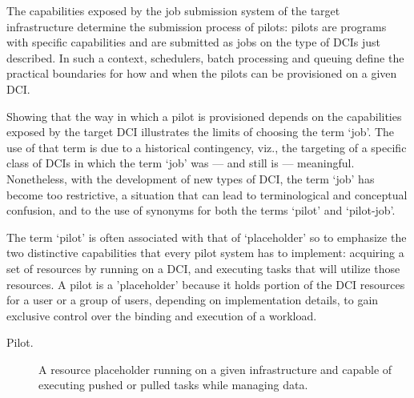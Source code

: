 \documentclass{sig-alternate}
\begin{document}
The capabilities exposed by the job submission system of the target
infrastructure determine the submission process of pilots: pilots are programs
with specific capabilities and are submitted as jobs on the type of DCIs just
described. In such a context, schedulers, batch processing and queuing define
the practical boundaries for how and when the pilots can be provisioned on a
given DCI.

Showing that the way in which a pilot is provisioned depends on the
capabilities exposed by the target DCI illustrates the limits of choosing the
term `job'. The use of that term is due to a historical contingency, viz., the
targeting of a specific class of DCIs in which the term `job' was --- and still
is --- meaningful. Nonetheless, with the development of new types of DCI, the
term `job' has become too restrictive, a situation that can lead to
terminological and conceptual confusion, and to the use of synonyms for both
the terms `pilot' and `pilot-job'.

The term `pilot' is often associated with that of `placeholder' so to
emphasize the two distinctive capabilities that every pilot system has to
implement: acquiring a set of resources by running on a DCI, and executing
tasks that will utilize those resources. A pilot is a 'placeholder' because it
holds portion of the DCI resources for a user or a group of users, depending
on implementation details, to gain exclusive control over the binding and
execution of a workload.

\begin{description}
\item[Pilot.] A resource placeholder running on a given infrastructure
  and capable of executing pushed or pulled tasks while managing
  data.
\end{description}
\end{document}
